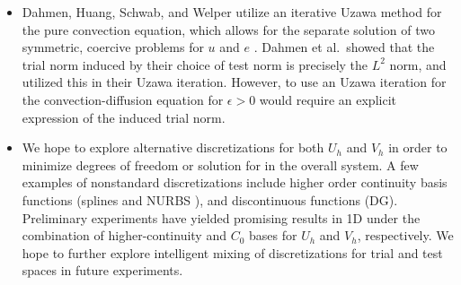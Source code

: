 \documentclass[final,leqno]{siamltex}
\newcommand{\bs}[1]{\boldsymbol{#1}}
\begin{document}
\begin{itemize}
\item Dahmen, Huang, Schwab, and Welper utilize an iterative Uzawa method for the pure convection equation, which allows for the separate solution of two symmetric, coercive problems for $u$ and $e$ \cite{dahmenConvection}.  Dahmen et al.\ showed that the trial norm induced by their choice of test norm is precisely the $L^2$ norm, and utilized this in their Uzawa iteration.  However, to use an Uzawa iteration for the convection-diffusion equation for $\epsilon > 0$ would require an explicit expression of the induced trial norm.  
\item We hope to explore alternative discretizations for both $U_h$ and $V_h$ in order to minimize degrees of freedom or solution for in the overall system.  A few examples of nonstandard discretizations include higher order continuity basis functions (splines and NURBS \cite{NURBSorig}), and discontinuous functions (DG).  Preliminary experiments have yielded promising results in 1D under the combination of higher-continuity and $C_0$ bases for $U_h$ and $V_h$, respectively.  We hope to further explore intelligent mixing of discretizations for trial and test spaces in future experiments.  

\end{itemize}
\end{document}
